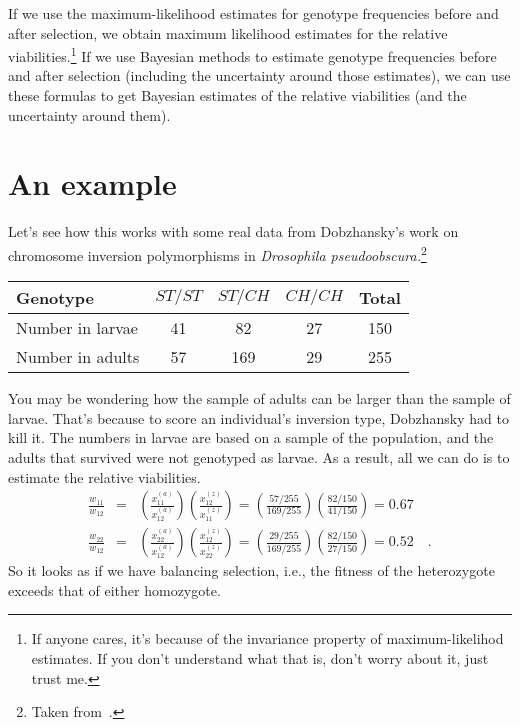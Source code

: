If we use the maximum-likelihood estimates for genotype frequencies
before and after selection, we obtain maximum likelihood estimates for
the relative viabilities.\footnote{If anyone cares, it's because of
  the invariance property of maximum-likelihod estimates. If you don't
  understand what that is, don't worry about it, just trust me.} If we
use Bayesian methods to estimate genotype frequencies before and after
selection (including the uncertainty around those estimates), we can
use these formulas to get Bayesian estimates of the relative
viabilities (and the uncertainty around them).

\section*{An example}

Let's see how this works with some real data from Dobzhansky's work on
chromosome inversion polymorphisms in {\it Drosophila
pseudoobscura.}\footnote{Taken from~\cite{Dobzhansky-1947}.}

\begin{center}
\begin{tabular}{l|ccc|c}
\hline\hline
Genotype & $ST/ST$ & $ST/CH$ & $CH/CH$ & Total \\
\hline
Number in larvae & 41 & 82 & 27 & 150 \\
Number in adults & 57 & 169 & 29 & 255 \\
\hline
\end{tabular}
\end{center}

You may be wondering how the sample of adults can be larger than the
sample of larvae. That's because to score an individual's inversion
type, Dobzhansky had to kill it. The numbers in larvae are based on a
sample of the population, and the adults that survived were not
genotyped as larvae. As a result, all we can do is to estimate the
relative viabilities.
\begin{eqnarray*}
\frac{w_{11}}{w_{12}} &=& \left(\frac{x_{11}^{(a)}}{x_{12}^{(a)}}\right)
                          \left(\frac{x_{12}^{(z)}}{x_{11}^{(z)}}\right)
= \left(\frac{57/255}{169/255}\right)
  \left(\frac{82/150}{41/150}\right)
= 0.67 \\
\frac{w_{22}}{w_{12}} &=& \left(\frac{x_{22}^{(a)}}{x_{12}^{(a)}}\right)
                          \left(\frac{x_{12}^{(z)}}{x_{22}^{(z)}}\right)
= \left(\frac{29/255}{169/255}\right)
  \left(\frac{82/150}{27/150}\right)
= 0.52 \quad .
\end{eqnarray*}
So it looks as if we have balancing selection, i.e., the fitness of
the heterozygote exceeds that of either homozygote.

